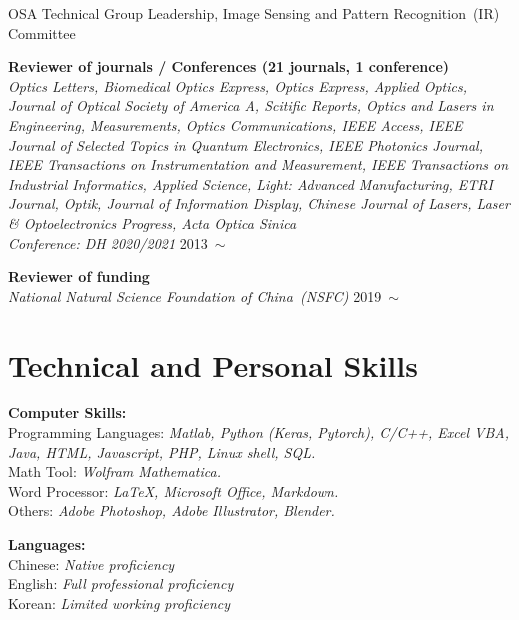 \documentclass[10pt,a4paper]{moderncv}
\begin{document}
	{OSA Technical Group Leadership, Image Sensing and Pattern Recognition~(IR)}
	{Committee}
	{}{\textit{}}{}
	
	\textbf{Reviewer of journals / Conferences (21 journals, 1 conference)} \\
	{\em Optics Letters, Biomedical Optics Express, Optics Express, Applied Optics, Journal of Optical Society of America A,  
	Scitific Reports, Optics and Lasers in Engineering, Measurements, Optics Communications, 
	IEEE Access, IEEE Journal of Selected Topics in Quantum Electronics, IEEE Photonics Journal, IEEE Transactions on Instrumentation and Measurement, IEEE Transactions on Industrial Informatics,
	Applied Science, Light: Advanced Manufacturing, 
	ETRI Journal, Optik, Journal of Information Display, Chinese Journal of Lasers, Laser \& Optoelectronics Progress,  Acta Optica Sinica \\
	Conference: DH 2020/2021
	} 
	\hfill 2013~$\sim$
	
	\textbf{Reviewer of funding} \\
	{\em National Natural Science Foundation of China~(NSFC)
	} 
	\hfill 2019~$\sim$

\section{Technical and Personal Skills}
\textbf{Computer Skills:}
	\\Programming Languages: {\em Matlab, Python (Keras, Pytorch), C/C++, Excel VBA, Java, HTML, Javascript, PHP, Linux shell, SQL.}
	\\Math Tool: {\em Wolfram Mathematica.}
	\\Word Processor: {\em \LaTeX, Microsoft Office, Markdown.}
	\\Others: {\em Adobe Photoshop, Adobe Illustrator, Blender.}
	
\vspace{3pt}

\textbf{Languages:}
	\\Chinese: {\em Native proficiency}
	\\English: {\em Full professional proficiency}
	\\Korean: {\em Limited working proficiency}
\end{document}
